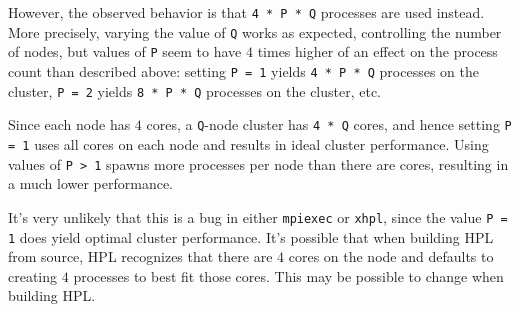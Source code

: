 \documentclass{article}
\begin{document}
However, the observed behavior is that \texttt{4 * P * Q} processes are used instead. More precisely, varying the value of \texttt{Q} works as expected, controlling the number of nodes, but values of \texttt{P} seem to have $4$ times higher of an effect on the process count than described above: setting \texttt{P = 1} yields \texttt{4 * P * Q} processes on the cluster, \texttt{P = 2} yields \texttt{8 * P * Q} processes on the cluster, etc.

Since each node has $4$ cores, a \texttt{Q}-node cluster has \texttt{4 * Q} cores, and hence setting \texttt{P = 1} uses all cores on each node and results in ideal cluster performance. Using values of \texttt{P > 1} spawns more processes per node than there are cores, resulting in a much lower performance. 

It's very unlikely that this is a bug in either \texttt{mpiexec} or \texttt{xhpl}, since the value \texttt{P = 1} does yield optimal cluster performance. It's possible that when building HPL from source, HPL recognizes that there are $4$ cores on the node and defaults to creating $4$ processes to best fit those cores. This may be possible to change when building HPL.
\end{document}
